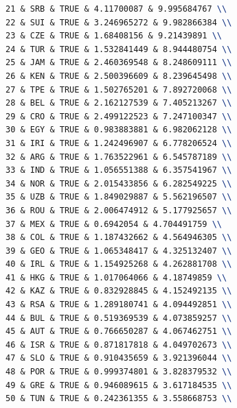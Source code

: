 \documentclass[12pt]{article}
\begin{document}
\begin{enumerate}
\begin{lstlisting}[language=Latex, style=mystyle]
21 & SRB & TRUE & 4.11700087 & 9.995684767 \\
22 & SUI & TRUE & 3.246965272 & 9.982866384 \\
23 & CZE & TRUE & 1.68408156 & 9.21439891 \\
24 & TUR & TRUE & 1.532841449 & 8.944480754 \\
25 & JAM & TRUE & 2.460369548 & 8.248609111 \\
26 & KEN & TRUE & 2.500396609 & 8.239645498 \\
27 & TPE & TRUE & 1.502765201 & 7.892720068 \\
28 & BEL & TRUE & 2.162127539 & 7.405213267 \\
29 & CRO & TRUE & 2.499122523 & 7.247100347 \\
30 & EGY & TRUE & 0.983883881 & 6.982062128 \\
31 & IRI & TRUE & 1.242496907 & 6.778206524 \\
32 & ARG & TRUE & 1.763522961 & 6.545787189 \\
33 & IND & TRUE & 1.056551388 & 6.357541967 \\
34 & NOR & TRUE & 2.015433856 & 6.282549225 \\
35 & UZB & TRUE & 1.849029887 & 5.562196507 \\
36 & ROU & TRUE & 2.006474912 & 5.177925657 \\
37 & MEX & TRUE & 0.6942054 & 4.704491759 \\
38 & COL & TRUE & 1.187432662 & 4.564946305 \\
39 & GEO & TRUE & 1.065348417 & 4.325132407 \\
40 & IRL & TRUE & 1.154925268 & 4.262881708 \\
41 & HKG & TRUE & 1.017064066 & 4.18749859 \\
42 & KAZ & TRUE & 0.832928845 & 4.152492135 \\
43 & RSA & TRUE & 1.289180741 & 4.094492851 \\
44 & BUL & TRUE & 0.519369539 & 4.073859257 \\
45 & AUT & TRUE & 0.766650287 & 4.067462751 \\
46 & ISR & TRUE & 0.871817818 & 4.049702673 \\
47 & SLO & TRUE & 0.910435659 & 3.921396044 \\
48 & POR & TRUE & 0.999374801 & 3.828379532 \\
49 & GRE & TRUE & 0.946089615 & 3.617184535 \\
50 & TUN & TRUE & 0.242361355 & 3.558668753 \\

\end{lstlisting}
\end{enumerate}
\end{document}

